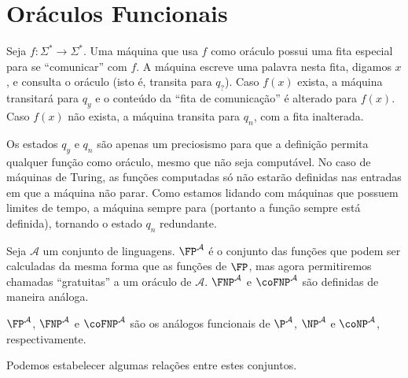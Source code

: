 \section{Oráculos Funcionais}

\begin{definition}
    Seja $f : \Sigma^* \rightarrow \Sigma^*$.
    Uma máquina que usa $f$ como oráculo
    possui uma fita especial para se ``comunicar'' com $f$.
    A máquina escreve uma palavra nesta fita,
    digamos $x$,
    e consulta o oráculo
    (isto é, transita para $q_?$).
    Caso $f(x)$ exista,
    a máquina transitará para $q_y$
    e o conteúdo da ``fita de comunicação'' é alterado para $f(x)$.
    Caso $f(x)$ não exista,
    a máquina transita para $q_n$,
    com a fita inalterada.
\end{definition}

Os estados $q_y$ e $q_n$ são apenas um preciosismo
para que a definição permita qualquer função como oráculo,
mesmo que não seja computável.
No caso de máquinas de Turing,
as funções computadas só não estarão definidas
nas entradas em que a máquina não parar.
Como estamos lidando com máquinas que possuem limites de tempo,
a máquina sempre para
(portanto a função sempre está definida),
tornando o estado $q_n$ redundante.

\begin{definition}
    Seja $\mathcal A$ um conjunto de linguagens.
    $\FP^\mathcal A$ é o conjunto das funções
    que podem ser calculadas da mesma forma que as funções de $\FP$,
    mas agora permitiremos chamadas ``gratuitas'' a um oráculo de $\mathcal A$.
    $\FNP^\mathcal A$ e $\coFNP^\mathcal A$
    são definidas de maneira análoga.
\end{definition}

$\FP^\mathcal A$, $\FNP^\mathcal A$ e $\coFNP^\mathcal A$
são os análogos funcionais de
$\P^\mathcal A$, $\NP^\mathcal A$ e $\coNP^\mathcal A$,
respectivamente.

Podemos estabelecer algumas relações entre estes conjuntos.

